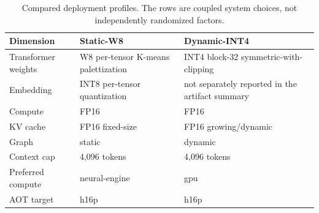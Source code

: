 \begin{table}[H]
\centering
\small
\setlength{\tabcolsep}{4pt}
\begin{tabularx}{\textwidth}{@{}p{}XX@{}}
\toprule
Dimension & Static-W8 & Dynamic-INT4 \\
\midrule
Transformer weights & W8 per-tensor K-means palettization & INT4 block-32 symmetric-with-clipping \\
Embedding & INT8 per-tensor quantization & not separately reported in the artifact summary \\
Compute & FP16 & FP16 \\
KV cache & FP16 fixed-size & FP16 growing/dynamic \\
Graph & static & dynamic \\
Context cap & 4,096 tokens & 4,096 tokens \\
Preferred compute & neural-engine & gpu \\
AOT target & h16p & h16p \\
\bottomrule
\end{tabularx}
\caption{Compared deployment profiles. The rows are coupled system choices, not independently randomized factors. }
\label{tab:profiles}
\end{table}
